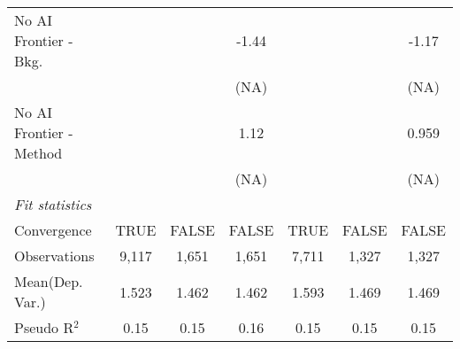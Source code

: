 \begin{tabular}{lcccccc}
   No AI Frontier - Bkg.   &               &        & -1.44  &               &        & -1.17\\   
                           &               &        & (NA)   &               &        & (NA)\\   
   No AI Frontier - Method &               &        & 1.12   &               &        & 0.959\\   
                           &               &        & (NA)   &               &        & (NA)\\   
   \midrule
   \emph{Fit statistics}\\
   Convergence             &TRUE           & FALSE  & FALSE  & TRUE          & FALSE  & FALSE\\  
   Observations            & 9,117         & 1,651  & 1,651  & 7,711         & 1,327  & 1,327\\  
Mean(Dep. Var.) & 1.523 & 1.462 & 1.462 & 1.593 & 1.469 & 1.469 \\
   Pseudo R$^2$            & 0.15          & 0.15   & 0.16   & 0.15          & 0.15   & 0.15\\  
   

\end{tabular}
